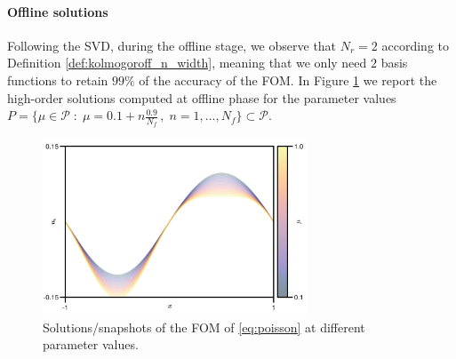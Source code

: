 \documentclass[../main.tex]{subfiles}
\begin{document}
\paragraph{Offline solutions}\label{par:poisson_fom}

Following the SVD, during the offline stage, we observe that $N_{r}=2$ according to Definition \ref{def:kolmogoroff_n_width}, meaning that we only need $2$ basis functions to retain $99\%$ of the accuracy of the FOM.
In Figure \ref{fig:poisson_fom} we report the high-order solutions computed at offline phase for the parameter values $P=\{\mu\in\mathcal{P}\;:\;\mu = 0.1 + n\frac{0.9}{N_{f}}\,,\;n=1,\dots,N_{f}\}\subset\mathcal{P}$.

\begin{figure}[H]
    \centering 
    \includegraphics[keepaspectratio, width=0.7\textwidth]{../figures/fig:poisson_fom.png}
    \caption{Solutions/snapshots of the FOM of \eqref{eq:poisson} at different parameter values.}
    \label{fig:poisson_fom}
\end{figure}
\end{document}
